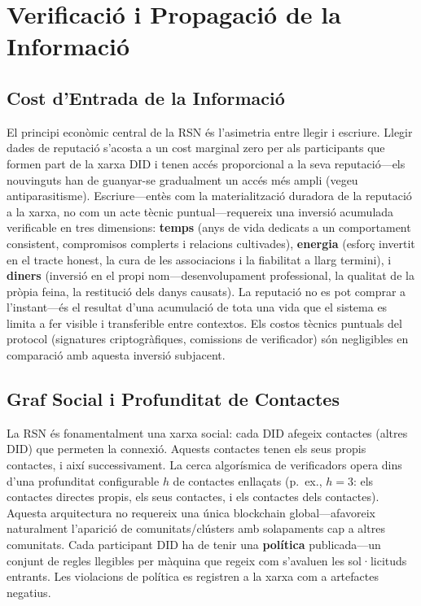 \documentclass[11pt,a4paper,twocolumn]{article}
\begin{document}
\section{Verificació i Propagació de la Informació}

\subsection{Cost d'Entrada de la Informació}

El principi econòmic central de la RSN és l'asimetria entre llegir i escriure. Llegir dades de reputació s'acosta a un cost marginal zero per als participants que formen part de la xarxa DID i tenen accés proporcional a la seva reputació---els nouvinguts han de guanyar-se gradualment un accés més ampli (vegeu antiparasitisme). Escriure---entès com la materialització duradora de la reputació a la xarxa, no com un acte tècnic puntual---requereix una inversió acumulada verificable en tres dimensions: \textbf{temps} (anys de vida dedicats a un comportament consistent, compromisos complerts i relacions cultivades), \textbf{energia} (esforç invertit en el tracte honest, la cura de les associacions i la fiabilitat a llarg termini), i \textbf{diners} (inversió en el propi nom---desenvolupament professional, la qualitat de la pròpia feina, la restitució dels danys causats). La reputació no es pot comprar a l'instant---és el resultat d'una acumulació de tota una vida que el sistema es limita a fer visible i transferible entre contextos. Els costos tècnics puntuals del protocol (signatures criptogràfiques, comissions de verificador) són negligibles en comparació amb aquesta inversió subjacent.

\subsection{Graf Social i Profunditat de Contactes}

La RSN és fonamentalment una xarxa social: cada DID afegeix contactes (altres DID) que permeten la connexió. Aquests contactes tenen els seus propis contactes, i així successivament. La cerca algorísmica de verificadors opera dins d'una profunditat configurable $h$ de contactes enllaçats (p.\ ex., $h=3$: els contactes directes propis, els seus contactes, i els contactes dels contactes). Aquesta arquitectura no requereix una única blockchain global---afavoreix naturalment l'aparició de comunitats/clústers amb solapaments cap a altres comunitats. Cada participant DID ha de tenir una \textbf{política} publicada---un conjunt de regles llegibles per màquina que regeix com s'avaluen les sol·licituds entrants. Les violacions de política es registren a la xarxa com a artefactes negatius.
\end{document}
